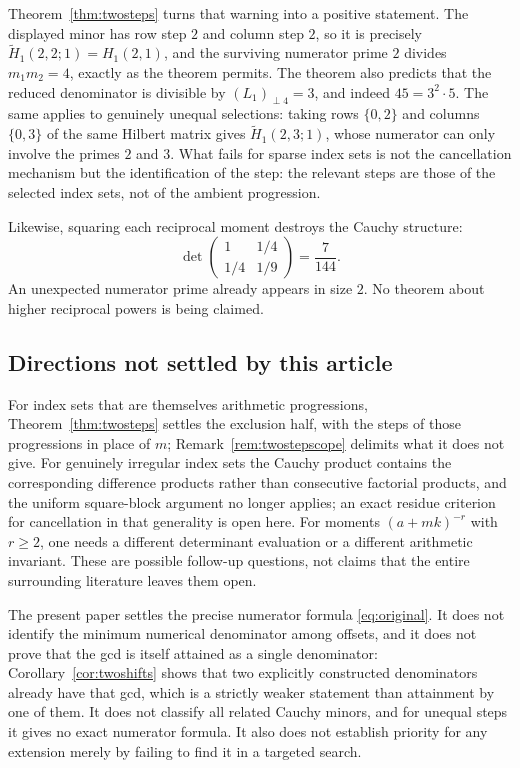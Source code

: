 \documentclass[11pt,a4paper]{article}
\numberwithin{equation}{section}
\theoremstyle{definition}
\theoremstyle{remark}
\begin{document}
Theorem~\ref{thm:twosteps} turns that warning into a positive statement. The displayed minor has row step $2$ and column step $2$, so it is precisely $\widetilde H_1(2,2;1)=H_1(2,1)$, and the surviving numerator prime $2$ divides $m_1m_2=4$, exactly as the theorem permits. The theorem also predicts that the reduced denominator is divisible by $(L_1)_{\perp4}=3$, and indeed $45=3^2\cdot5$. The same applies to genuinely unequal selections: taking rows $\{0,2\}$ and columns $\{0,3\}$ of the same Hilbert matrix gives $\widetilde H_1(2,3;1)$, whose numerator can only involve the primes $2$ and $3$. What fails for sparse index sets is not the cancellation mechanism but the identification of the step: the relevant steps are those of the selected index sets, not of the ambient progression.

Likewise, squaring each reciprocal moment destroys the Cauchy structure:
\[
 \det\begin{pmatrix}1&1/4\\1/4&1/9\end{pmatrix}=\frac7{144}.
\]
An unexpected numerator prime already appears in size $2$. No theorem about higher reciprocal powers is being claimed.

\subsection{Directions not settled by this article}
For index sets that are themselves arithmetic progressions, Theorem~\ref{thm:twosteps} settles the exclusion half, with the steps of those progressions in place of $m$; Remark~\ref{rem:twostepscope} delimits what it does not give. For genuinely irregular index sets the Cauchy product contains the corresponding difference products rather than consecutive factorial products, and the uniform square-block argument no longer applies; an exact residue criterion for cancellation in that generality is open here. For moments $(a+mk)^{-r}$ with $r\geq2$, one needs a different determinant evaluation or a different arithmetic invariant. These are possible follow-up questions, not claims that the entire surrounding literature leaves them open.

The present paper settles the precise numerator formula \eqref{eq:original}. It does not identify the minimum numerical denominator among offsets, and it does not prove that the gcd is itself attained as a single denominator: Corollary~\ref{cor:twoshifts} shows that two explicitly constructed denominators already have that gcd, which is a strictly weaker statement than attainment by one of them. It does not classify all related Cauchy minors, and for unequal steps it gives no exact numerator formula. It also does not establish priority for any extension merely by failing to find it in a targeted search.
\end{document}
